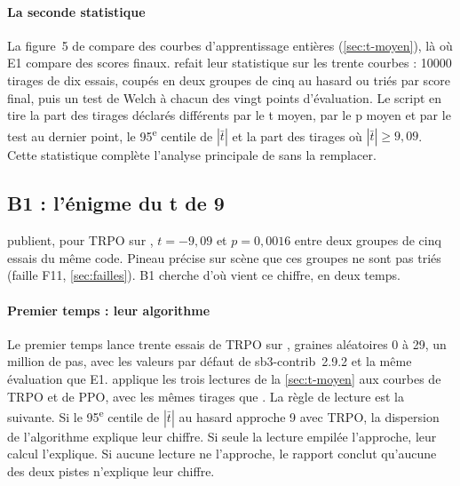 \paragraph{La seconde statistique}
La figure~5 de \textcite{henderson2018matters} compare des courbes d'apprentissage entières
(\cref{sec:t-moyen}), là où E1 compare des scores finaux.
 refait leur statistique sur les trente courbes : \num{10000} tirages de dix
essais, coupés en deux groupes de cinq au hasard ou triés par score final, puis un test de Welch à chacun des
vingt points d'évaluation. Le script en tire la part des tirages déclarés différents par le t moyen, par le p moyen
et par le test au dernier point, le 95\textsuperscript{e} centile de $|\bar t|$ et la part des tirages où
$|\bar t|\ge 9{,}09$. Cette statistique complète l'analyse principale de  sans la remplacer.

\subsection{B1 : l'énigme du t de 9}\label{sec:plan-b1}
\textcite{henderson2018matters} publient, pour TRPO sur , $t=-9{,}09$ et $p=0{,}0016$ entre
deux groupes de cinq essais du même code. Pineau précise sur scène que ces groupes ne sont pas triés (faille F11, \cref{sec:failles}). B1 cherche d'où
vient ce chiffre, en deux temps.

\paragraph{Premier temps : leur algorithme}
Le premier temps lance trente essais de TRPO sur
, graines aléatoires 0 à 29, un million de pas, avec les valeurs par défaut de
sb3-contrib~2.9.2 et la même évaluation que E1.  applique les trois lectures de
la \cref{sec:t-moyen} aux courbes de TRPO et de PPO, avec les mêmes tirages que . La règle
de lecture est la suivante. Si le 95\textsuperscript{e} centile de $|\bar t|$ au hasard approche 9 avec
TRPO, la dispersion de l'algorithme explique leur chiffre. Si seule la lecture empilée l'approche, leur calcul
l'explique. Si aucune lecture ne l'approche, le rapport conclut qu'aucune des deux pistes n'explique leur
chiffre.

